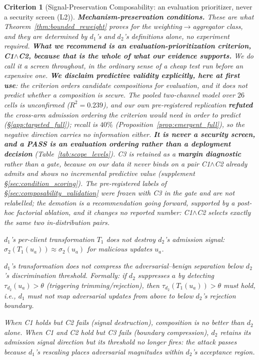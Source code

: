 \documentclass{article}
\newtheorem{criterion}[theorem]{Criterion}
\begin{document}
\begin{criterion}[Signal-Preservation Composability: an evaluation prioritizer, never a security screen (L2)]
\smallskip
\noindent\textbf{Mechanism-preservation conditions.} These are what Theorem~\ref{thm:bounded_reweight} proves for the weighting$\to$aggregator class, and they are determined by $d_1$'s and $d_2$'s definitions alone, no experiment required. \textbf{What we recommend is an \emph{evaluation-prioritization criterion}, C1$\wedge$C2, because that is the whole of what our evidence supports.} We do call it a \emph{screen} throughout, in the ordinary sense of a cheap test run before an expensive one. \textbf{We disclaim predictive validity explicitly, here at first use}: the criterion orders candidate compositions for evaluation, and it does \emph{not} predict whether a composition is secure. The pooled two-channel model over $26$ cells is unconfirmed ($R^2{=}0.239$), and our own pre-registered replication \textbf{refuted} the cross-arm admission ordering the criterion would need in order to predict (§\ref{app:targeted_full}); recall is $40\%$ (Proposition~\ref{prop:emergent_full}), so the negative direction carries no information either. \textbf{It is never a security screen, and a PASS is an evaluation ordering rather than a deployment decision} (Table~\ref{tab:scope_levels}). C3 is retained as a \textbf{margin diagnostic} rather than a gate, because on our data it never binds on a pair C1$\wedge$C2 already admits and shows no incremental predictive value (supplement §\ref{sec:condition_scoring}). \emph{The pre-registered labels of §\ref{sec:composability_validation} were frozen with C3 in the gate and are not relabelled}; the demotion is a recommendation going forward, supported by a post-hoc factorial ablation, and it changes no reported number: C1$\wedge$C2 selects exactly the same two in-distribution pairs.
\begin{description}[noitemsep,topsep=2pt]
\item[(C2) Signal preservation.] $d_1$'s per-client transformation $T_1$ does not destroy $d_2$'s admission signal: $\sigma_2(T_1(u_a)) \approx \sigma_2(u_a)$ for malicious updates $u_a$.
\item[(C3) Boundary preservation.] $d_1$'s transformation does not compress the adversarial--benign separation below $d_2$'s discrimination threshold. Formally: if $d_2$ suppresses $a$ by detecting $\tau_{d_2}(u_a) > \theta$ (triggering trimming/rejection), then $\tau_{d_2}(T_1(u_a)) > \theta$ must hold, i.e., $d_1$ must not map adversarial updates from above to below $d_2$'s rejection boundary.
\end{description}
When C1 holds but C2 fails (signal destruction), composition is no better than $d_2$ alone. When C1 and C2 hold but C3 fails (boundary compression), $d_2$ retains its admission signal direction but its threshold no longer fires: the attack passes because $d_1$'s rescaling places adversarial magnitudes within $d_2$'s acceptance region.
\end{criterion}
\end{document}
